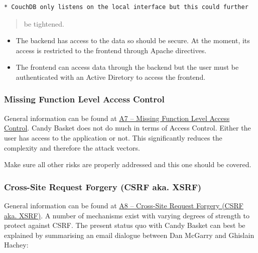 \documentclass[letterpaper,10pt,english]{sphinxmanual}
\begin{document}
\begin{Verbatim}[commandchars=\\\{\}]
* CouchDB only listens on the local interface but this could further
\end{Verbatim}
\begin{quote}

be tightened.
\end{quote}
\begin{itemize}
\item {} 
The backend has access to the data so should be secure. At the
moment, its access is restricted to the frontend through Apache directives.

\item {} 
The frontend can access data through the backend but the user must
be authenticated with an Active Diretory to access the frontend.

\end{itemize}


\subsubsection{Missing Function Level Access Control}
\label{developer-guide:missing-function-level-access-control}
General information can be found at \href{https://owasp.org/index.php/Top\_10\_2013-A7-Missing\_Function\_Level\_Access\_Control}{A7 -- Missing Function Level
Access Control}. Candy
Basket does not do much in terms of Access Control. Either the user
has access to the application or not. This significantly reduces the
complexity and therefore the attack vectors.

Make sure all other risks are properly addressed and this one should
be covered.


\subsubsection{Cross-Site Request Forgery (CSRF aka. XSRF)}
\label{developer-guide:cross-site-request-forgery-csrf-aka-xsrf}
General information can be found at \href{https://owasp.org/index.php/Top\_10\_2013-A8-Cross-Site\_Request\_Forgery\_\%28CSRF\%29}{A8 -- Cross-Site Request Forgery
(CSRF aka. XSRF)}.
A number of mechanisms exist with varying degrees of strength to
protect against CSRF. The present status quo with Candy Basket can
best be explained by summarising an email dialogue between Dan McGarry
and Ghislain Hachey:
\end{document}
